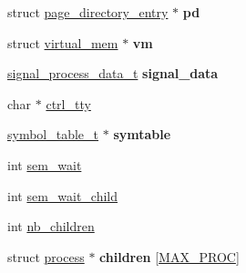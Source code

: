 \begin{DoxyCompactItemize}
\item 
\hypertarget{structprocess_abcbf7a270377aa5b48eb721846fb1c7e}{struct \hyperlink{structpage__directory__entry}{page\+\_\+directory\+\_\+entry} $\ast$ {\bfseries pd}}\label{structprocess_abcbf7a270377aa5b48eb721846fb1c7e}

\item 
\hypertarget{structprocess_a24ef7b4ac4d8fb179021edafc01382e2}{struct \hyperlink{structvirtual__mem}{virtual\+\_\+mem} $\ast$ {\bfseries vm}}\label{structprocess_a24ef7b4ac4d8fb179021edafc01382e2}

\item 
\hypertarget{structprocess_aa0b756ca0430888550293be06072ff81}{\hyperlink{structsignal__process__data__t}{signal\+\_\+process\+\_\+data\+\_\+t} {\bfseries signal\+\_\+data}}\label{structprocess_aa0b756ca0430888550293be06072ff81}

\item 
char $\ast$ \hyperlink{structprocess_ac44ae9d0fbc98179b8f89bf666580086}{ctrl\+\_\+tty}
\item 
\hypertarget{structprocess_aa0d0b60e2eb7539ac10277bbe5fed4ff}{\hyperlink{structsymbol__table__t}{symbol\+\_\+table\+\_\+t} $\ast$ {\bfseries symtable}}\label{structprocess_aa0d0b60e2eb7539ac10277bbe5fed4ff}

\item 
int \hyperlink{structprocess_ac41b1192ed3707ececd1b3d5a8030e07}{sem\+\_\+wait}
\item 
int \hyperlink{structprocess_af6d26a303bcfd1d6fb8249b26aa1b8a8}{sem\+\_\+wait\+\_\+child}
\item 
int \hyperlink{structprocess_a3c7e75af24b759fca4705883fd3bc68a}{nb\+\_\+children}
\item 
\hypertarget{structprocess_abbe1ee17bb932b72a9c3f1aaf4475d42}{struct \hyperlink{structprocess}{process} $\ast$ {\bfseries children} \mbox{[}\hyperlink{kprocess_8h_a63e32d00bc48471b4db49d481ac228dc}{M\+A\+X\+\_\+\+P\+R\+O\+C}\mbox{]}}\label{structprocess_abbe1ee17bb932b72a9c3f1aaf4475d42}

\end{DoxyCompactItemize}


